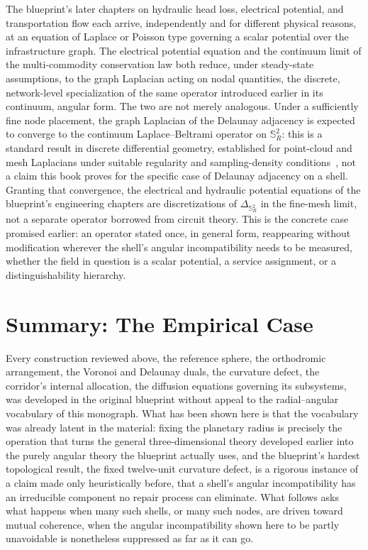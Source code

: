 \documentclass[11pt,fleqn]{book}
\numberwithin{equation}{chapter}
\theoremstyle{plain}
\theoremstyle{definition}
\theoremstyle{remark}
\newcommand{\Sphere}{\mathbb{S}^{2}}
\begin{document}
The blueprint's later chapters on hydraulic head loss, electrical potential, and transportation flow each arrive, independently and for different physical reasons, at an equation of Laplace or Poisson type governing a scalar potential over the infrastructure graph. The electrical potential equation and the continuum limit of the multi-commodity conservation law both reduce, under steady-state assumptions, to the graph Laplacian acting on nodal quantities, the discrete, network-level specialization of the same operator introduced earlier in its continuum, angular form. The two are not merely analogous. Under a sufficiently fine node placement, the graph Laplacian of the Delaunay adjacency is expected to converge to the continuum Laplace--Beltrami operator on \(\Sphere_R\): this is a standard result in discrete differential geometry, established for point-cloud and mesh Laplacians under suitable regularity and sampling-density conditions~\cite{belkinniyogi2008}, not a claim this book proves for the specific case of Delaunay adjacency on a shell. Granting that convergence, the electrical and hydraulic potential equations of the blueprint's engineering chapters are discretizations of \(\Delta_{\Sphere_R}\) in the fine-mesh limit, not a separate operator borrowed from circuit theory. This is the concrete case promised earlier: an operator stated once, in general form, reappearing without modification wherever the shell's angular incompatibility needs to be measured, whether the field in question is a scalar potential, a service assignment, or a distinguishability hierarchy.

\section{Summary: The Empirical Case}

Every construction reviewed above, the reference sphere, the orthodromic arrangement, the Voronoi and Delaunay duals, the curvature defect, the corridor's internal allocation, the diffusion equations governing its subsystems, was developed in the original blueprint without appeal to the radial--angular vocabulary of this monograph. What has been shown here is that the vocabulary was already latent in the material: fixing the planetary radius is precisely the operation that turns the general three-dimensional theory developed earlier into the purely angular theory the blueprint actually uses, and the blueprint's hardest topological result, the fixed twelve-unit curvature defect, is a rigorous instance of a claim made only heuristically before, that a shell's angular incompatibility has an irreducible component no repair process can eliminate. What follows asks what happens when many such shells, or many such nodes, are driven toward mutual coherence, when the angular incompatibility shown here to be partly unavoidable is nonetheless suppressed as far as it can go.
\end{document}
